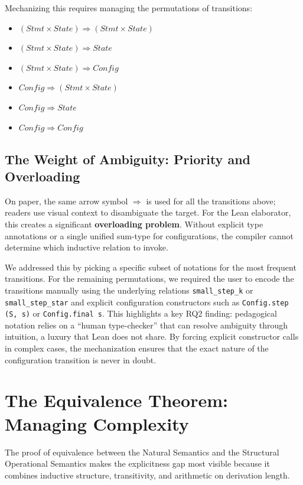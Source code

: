 Mechanizing this requires managing the permutations of transitions:
\begin{itemize}
    \item $(Stmt \times State) \Rightarrow (Stmt \times State)$
    \item $(Stmt \times State) \Rightarrow State$
    \item $(Stmt \times State)  \Rightarrow Config$
    \item $Config \Rightarrow (Stmt \times State)$
    \item $Config \Rightarrow State$
    \item $Config  \Rightarrow Config$
\end{itemize}

\subsection*{The Weight of Ambiguity: Priority and Overloading}
On paper, the same arrow symbol $\Rightarrow$ is used for all the transitions above;
readers use visual context to disambiguate the target. For the Lean elaborator,
this creates a significant \textbf{overloading problem}. Without explicit type
annotations or a single unified sum-type for configurations, the compiler cannot
determine which inductive relation to invoke.

We addressed this by picking a specific subset of notations for the most frequent transitions.
For the remaining permutations, we required the user to encode the transitions manually
using the underlying relations \texttt{small\_step\_k} or \texttt{small\_step\_star}
and explicit configuration constructors such as \texttt{Config.step (S, s)} or
\texttt{Config.final s}. This highlights a key RQ2 finding: pedagogical notation
relies on a ``human type-checker'' that can resolve ambiguity through intuition, a 
luxury that Lean does not share. By forcing explicit constructor calls in
complex cases, the mechanization ensures that the exact nature of the configuration
transition is never in doubt.

%
%
%
\section{The Equivalence Theorem: Managing Complexity}
\label{discussion:sec:equivalence_complexity}

The proof of equivalence between the Natural Semantics and the Structural Operational Semantics
makes the explicitness gap most visible because it
combines inductive structure, transitivity, and arithmetic on derivation length.

